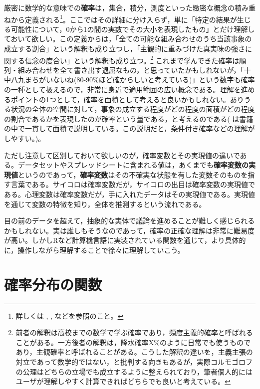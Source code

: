 \documentclass[
  a4paper,
]{ltjsbook}
\begin{document}
厳密に数学的な意味での\textbf{確率}は，集合，積分，測度といった緻密な概念の積み重ねから定義される\footnote{詳しくは
  \textcite{Yoshida2021-02-25} , \textcite{Kono1999-05-01},
  \textcite{Sato1994-02-25} などを参照のこと。}。ここではその詳細に分け入らず，単に「特定の結果が生じる可能性について，0から1の間の実数でその大小を表現したもの」とだけ理解しておいて欲しい。この定義からは，「全ての可能な組み合わせのうち当該事象の成立する割合」という解釈も成り立つし，「主観的に重みづけた真実味の強さに関する信念の度合い」という解釈も成り立つ。\footnote{前者の解釈は高校までの数学で学ぶ確率であり，頻度主義的確率と呼ばれることがある。一方後者の解釈は，降水確率X\%のように日常でも使うものであり，主観確率と呼ばれることがある。こうした解釈の違いを，主義主張の対立であって数学的ではない，と批判する向きもあるが，実際コルモゴロフの公理はどちらの立場でも成立するように整えられており，筆者個人的にはユーザが理解しやすく計算できればどちらでも良いと考えている。}
これまで学んできた確率は順列・組み合わせを全て書き出す退屈なもの，と思っていたかもしれないが，「十中八九まちがいないね(80-90\%ほど確からしいと考えている)」という数字も確率の一種として扱えるので，非常に身近で適用範囲の広い概念である。理解を進めるポイントの1つとして，確率を面積として考えると良いかもしれない。ありうる状況の全体の空間に対して，事象の成立する程度がどの程度の面積がどの程度の割合であるかを表現したのが確率という量である，と考えるのである(
\textcite{Hiraoka200910}
は書籍の中で一貫して面積で説明している。この説明だと，条件付き確率などの理解がしやすい。)。

ただし注意して区別しておいて欲しいのが，確率変数とその実現値の違いである。データセットやスプレッドシートに含まれる値は，あくまでも\textbf{確率変数の実現値}というのであって，\textbf{確率変数}はその不確実な状態を有した変数そのものを指す言葉である。サイコロは確率変数だが，サイコロの出目は確率変数の実現値である。心理変数は確率変数だが，手に入れたデータはその実現値である。実現値を通じて変数の特徴を知り，全体を推測するという流れである。

目の前のデータを超えて，抽象的な実体で議論を進めることが難しく感じられるかもしれない。実は誰しもそうなのであって，確率の正確な理解は非常に難易度が高い。しかしRなど計算機言語に実装されている関数を通じて，より具体的に，操作しながら理解することで徐々に理解していこう。

\section{確率分布の関数}\label{ux78baux7387ux5206ux5e03ux306eux95a2ux6570}
\end{document}
